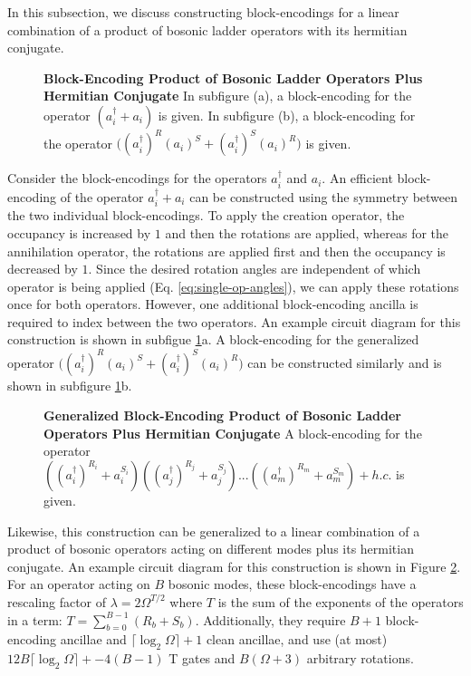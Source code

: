 In this subsection, we discuss constructing block-encodings for a linear combination of a product of bosonic ladder operators with its hermitian conjugate.


\begin{figure}
    
    
    \caption{
        \textbf{Block-Encoding Product of Bosonic Ladder Operators Plus Hermitian Conjugate}
        In subfigure (a), a block-encoding for the operator $(a_i^\dagger + a_i)$ is given.
        In subfigure (b), a block-encoding for the operator $\big((a_i^\dagger)^R (a_i)^S + (a_i^\dagger)^S (a_i)^R\big)$ is given.
    }
    \label{fig:lc-bosonic}
\end{figure}


Consider the block-encodings for the operators $a_i^\dagger$ and $a_i$.
An efficient block-encoding of the operator $a_i^\dagger + a_i$ can be constructed using the symmetry between the two individual block-encodings. 
To apply the creation operator, the occupancy is increased by $1$ and then the rotations are applied, whereas for the annihilation operator, the rotations are applied first and then the occupancy is decreased by $1$.
Since the desired rotation angles are independent of which operator is being applied (Eq. \ref{eq:single-op-angles}), we can apply these rotations once for both operators.
However, one additional block-encoding ancilla is required to index between the two operators.
An example circuit diagram for this construction is shown in subfigue \ref{fig:lc-bosonic}a.
A block-encoding for the generalized operator $\big((a_i^\dagger)^R (a_i)^S + (a_i^\dagger)^S (a_i)^R\big)$ can be constructed similarly and is shown in subfigure \ref{fig:lc-bosonic}b.

\begin{figure}
    
    \caption{
        \textbf{Generalized Block-Encoding Product of Bosonic Ladder Operators Plus Hermitian Conjugate}
        A block-encoding for the operator $((a_i^\dagger)^{R_i} + a_i^{S_i})((a_j^\dagger)^{R_j} + a_j^{S_j})...((a_m^\dagger)^{R_m} + a_m^{S_m}) + h.c.$ is given.
    }
    \label{fig:lc-bosonic-general}
\end{figure}

Likewise, this construction can be generalized to a linear combination of a product of bosonic operators acting on different modes plus its hermitian conjugate.
An example circuit diagram for this construction is shown in Figure \ref{fig:lc-bosonic-general}.
For an operator acting on $B$ bosonic modes, these block-encodings have a rescaling factor of $\lambda = 2 \Omega^{T/2}$ where $T$ is the sum of the exponents of the operators in a term: $T = \sum_{b=0}^{B-1}(R_b+S_b)$.
Additionally, they require $B+1$ block-encoding ancillae and $\lceil{\log_2{\Omega}}\rceil + 1$ clean ancillae, and use (at most) $12B \lceil \log_2 \Omega \rceil + - 4(B - 1)$ T gates and $B(\Omega + 3)$ arbitrary rotations.


